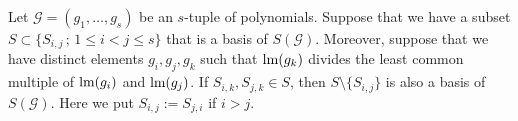 \begin{Prop}\label{prop:reduction_of_syzygy_basis} Let $\mathcal{G}=(g_1,\ldots,g_s)$ be an $s$-tuple of polynomials. Suppose that we have a subset $S \subset \{S_{i,j} \,;\, 1\leq i <j \leq s\}$ that is a basis of $S(\mathcal{G})$. Moreover, suppose that we have distinct elements $g_i,g_j,g_k$ such that $\textnormal{lm}(g_k)$ divides the least common multiple of $\textnormal{lm}(g_i)$ and $\textnormal{lm}(g_j)$. If $S_{i,k},S_{j,k}\in S$, then $S\setminus \{S_{i,j}\}$ is also a basis of $S(\mathcal{G})$. Here we put $S_{i,j} := S_{j,i}$ if $i> j$. 
\end{Prop}
